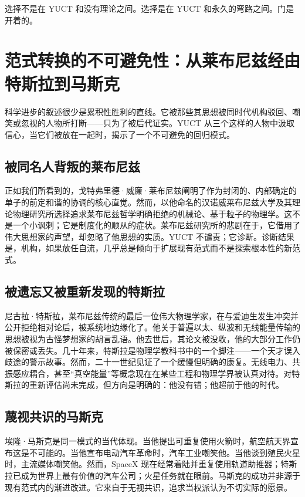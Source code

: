 \documentclass[12pt,a4paper]{article}
\begin{document}
	选择不是在 YUCT 和没有理论之间。选择是在 YUCT 和永久的弯路之间。门是开着的。
	
	\section{范式转换的不可避免性：从莱布尼兹经由特斯拉到马斯克}
	
	科学进步的叙述很少是累积性胜利的直线。它被那些其思想被同时代机构驳回、嘲笑或忽视的人物所打断——只为了被后代证实。YUCT 从三个这样的人物中汲取信心，当它们被放在一起时，揭示了一个不可避免的回归模式。
	
	\subsection{被同名人背叛的莱布尼兹}
	
	正如我们所看到的，戈特弗里德·威廉·莱布尼兹阐明了作为封闭的、内部确定的单子的前定和谐的协调的核心直觉。然而，以他命名的汉诺威莱布尼兹大学及其理论物理研究所选择追求莱布尼兹哲学明确拒绝的机械论、基于粒子的物理学。这不是一个小讽刺；它是制度化的顺从的症状。莱布尼兹研究所的悲剧在于，它借用了伟大思想家的声望，却忽略了他思想的实质。YUCT 不谴责；它诊断。诊断结果是，机构，如果放任自流，几乎总是倾向于扩展现有范式而不是探索根本性的新范式。
	
	\subsection{被遗忘又被重新发现的特斯拉}
	
	尼古拉·特斯拉，莱布尼兹传统的最后一位伟大物理学家，在与爱迪生发生冲突并公开拒绝相对论后，被系统地边缘化了。他关于普遍以太、纵波和无线能量传输的思想被视为古怪梦想家的胡言乱语。他去世后，其论文被没收，他的大部分工作仍被保密或丢失。几十年来，特斯拉是物理学教科书中的一个脚注——一个天才误入歧途的警示故事。然而，二十一世纪见证了一个缓慢但明确的康复。无线电力、共振感应耦合，甚至“真空能量”等概念现在在某些工程和物理学界被认真对待。对特斯拉的重新评估尚未完成，但方向是明确的：他没有错；他超前于他的时代。
	
	\subsection{蔑视共识的马斯克}
	
	埃隆·马斯克是同一模式的当代体现。当他提出可重复使用火箭时，航空航天界宣布这是不可能的。当他宣布电动汽车革命时，汽车工业嘲笑他。当他谈到殖民火星时，主流媒体嘲笑他。然而，SpaceX 现在经常着陆并重复使用轨道助推器；特斯拉已成为世界上最有价值的汽车公司；火星任务就在眼前。马斯克的成功并非源于现有范式内的渐进改进。它来自于无视共识，追求当权派认为不切实际的愿景。
	
\end{document}

